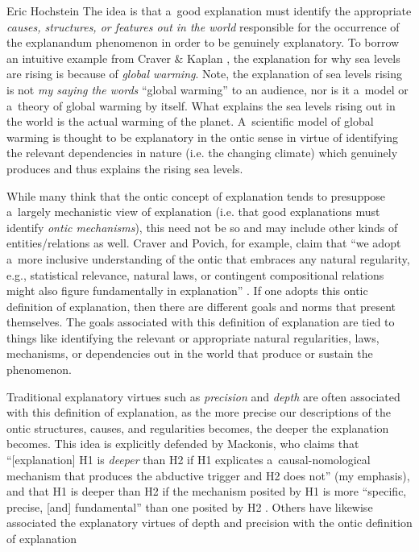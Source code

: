 \begin{artengenv}{Eric Hochstein}
The idea is that a~good explanation must identify the appropriate \textit{causes, structures, or features out in the world} responsible for the occurrence of the explanandum phenomenon in order to be genuinely explanatory. To borrow an intuitive example from Craver \& Kaplan
\parencite*[][pp.299–300]{craver_are_2020}, %
 the explanation for why sea levels are rising is because of \textit{global warming}. Note, the explanation of sea levels rising is not \textit{my saying the words} ``global warming'' to an audience, nor is it a~model or a~theory of global warming by itself. What explains the sea levels rising out in the world is the actual warming of the planet. A~scientific model of global warming is thought to be explanatory in the ontic sense in virtue of identifying the relevant dependencies in nature (i.e. the changing climate) which genuinely produces and thus explains the rising sea levels.

While many think that the ontic concept of explanation tends to presuppose a~largely mechanistic view of explanation (i.e. that good explanations must identify \textit{ontic mechanisms}), this need not be so and may include other kinds of entities/relations as well. Craver and Povich, for example, claim that ``we adopt a~more inclusive understanding of the ontic that embraces any natural regularity, e.g., statistical relevance, natural laws, or contingent compositional relations might also figure fundamentally in explanation''
\parencites[][p.32]{craver_directionality_2017}[see also:][]{povich_because_2018}. %
 If one adopts this ontic definition of explanation, then there are different goals and norms that present themselves. The goals associated with this definition of explanation are tied to things like identifying the relevant or appropriate natural regularities, laws, mechanisms, or dependencies out in the world that produce or sustain the phenomenon.

Traditional explanatory virtues such as \textit{precision} and \textit{depth} are often associated with this definition of explanation, as the more precise our descriptions of the ontic structures, causes, and regularities becomes, the deeper the explanation becomes. This idea is explicitly defended by Mackonis, who claims that ``[explanation] H1 is \textit{deeper} than H2 if H1 explicates a~causal-nomological mechanism that produces the abductive trigger and H2 does not'' (my emphasis), and that H1 is deeper than H2 if the mechanism posited by H1 is more ``specific, precise, [and] fundamental'' than one posited by H2
\parencite[][p.985]{mackonis_inference_2013}. %
 Others have likewise associated the explanatory virtues of depth and precision with the ontic definition of explanation 



\end{artengenv}
